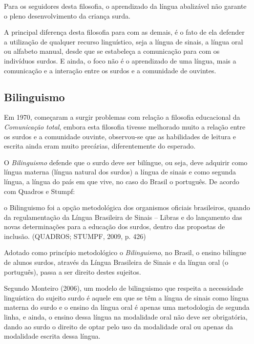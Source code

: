 \documentclass[brasil]{abnt}
\begin{document}
		 Para os seguidores desta filosofia, o aprendizado da língua abalizável não garante o pleno desenvolvimento da criança surda.
		 
		 A principal diferença desta filosofia para com as demais, é o fato de ela defender a utilização de qualquer recurso linguístico, seja a língua de sinais, a língua oral ou alfabeto manual, desde que 
		 se estabeleça a comunicação para com os indivíduos surdos. E ainda, o foco não é o aprendizado de uma língua, mais a comunicação e a interação entre os surdos e a comunidade de ouvintes.
		 
		\subsection{Bilinguismo}
			Em 1970, começaram a surgir problemas com relação a filosofia educacional da \textit{Comunicação total}, embora esta filosofia tivesse melhorado muito a relação entre os surdos e a comunidade 
			ouvinte, observou-se que as habilidades de leitura e escrita ainda eram muito precárias, diferentemente do esperado. 
			
			O \textit{Bilinguismo} defende que o surdo deve ser bilíngue, ou seja, deve adquirir como língua materna (língua natural dos surdos) a língua de sinais e como segunda língua, a língua do país em 
			que vive, no caso do Brasil o português. De acordo com Quadros e Stumpf:
			
				\begin{citacao}o Bilinguismo foi a opção metodológica dos organismos oficiais brasileiros, quando da regulamentação da Língua Brasileira de Sinais – Libras e do lançamento das novas 
								determinações para a educação dos surdos, dentro das propostas de inclusão. (QUADROS; STUMPF, 2009, p. 426)
				\end{citacao}
			
			Adotado como princípio metodológico o \textit{Bilinguismo}, no Brasil, o ensino bilíngue de alunos surdos, através da Língua Brasileira de Sinais e da língua oral (o português), passa a ser direito 
			destes sujeitos. 
			
			Segundo Monteiro (2006), um modelo de bilinguismo que respeita a necessidade linguística do sujeito surdo é aquele em que se têm a língua de sinais como língua materna do surdo e o ensino da língua 
			oral é apenas uma metodologia de segunda linha, e ainda, o ensino dessa língua na modalidade oral não deve ser obrigatória, dando ao surdo o direito de optar pelo uso da modalidade oral ou apenas 
			da modalidade escrita dessa língua.
						
\end{document}
